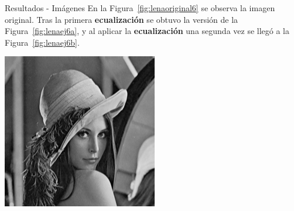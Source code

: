 \documentclass{beamer}
\begin{document}
\begin{frame}[fragile]{Resultados - Imágenes}
	\justifying
	En la Figura~\ref{fig:lenaoriginal6} se observa la imagen original.  
	Tras la primera \textcolor{unahurverde}{\textbf{ecualización}} se obtuvo la versión de la Figura~\ref{fig:lenaej6a},  
	y al aplicar la \textcolor{unahurverde}{\textbf{ecualización}} una segunda vez se llegó a la Figura~\ref{fig:lenaej6b}.
	
	\vspace{0.5cm}
	\centering
	\begin{minipage}{0.32\linewidth}
		\centering
		\includegraphics[width=\linewidth]{../results/lena_original}
		\label{fig:lenaoriginal6}
	\end{minipage}\hfill
	\begin{minipage}{0.32\linewidth}
		\centering

\end{minipage}
\end{frame}
\end{document}
